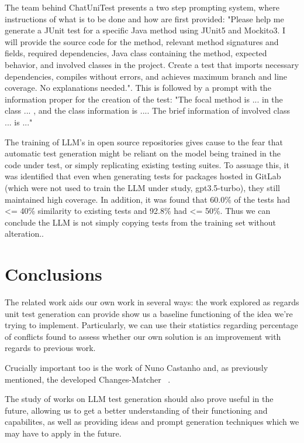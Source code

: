 The team behind ChatUniTest presents a two step prompting system, where instructions of what is to be done and how are first provided: "Please help me generate a JUnit test for a specific Java method using JUnit5 and Mockito3. I will provide the source code for the method, relevant method signatures and fields, required dependencies, Java class containing the method, expected behavior, and involved classes in the project. Create a test that imports necessary dependencies, compiles without errors, and achieves maximum branch and line coverage. No explanations needed.". This is followed by a prompt with the information proper for the creation of the test: "The focal method is ... in the class ... , and the class information is .... The brief information of involved class ... is ..." \citep{kn:chatunitest}


The training of LLM's in open source repositories gives cause to the fear that automatic test generation might be reliant on the model being trained in the code under test, or simply replicating existing testing suites. To assuage this, it was identified that even when generating tests for packages hosted in GitLab (which were not used to train the LLM under study, gpt3.5-turbo), they still maintained high coverage. In addition, it was found that 60.0\% of the tests had <= 40\% similarity to existing tests and 92.8\% had <= 50\%. Thus we can conclude the LLM is not simply copying tests from the training set without alteration.\citep{kn:max}.


\section{Conclusions}


The related work aids our own work in several ways: the work explored as regards unit test generation can provide show us a baseline functioning of the idea we're trying to implement. Particularly, we can use their statistics regarding percentage of conflicts found to assess whether our own solution is an improvement with regards to previous work.

Crucially important too is the work of Nuno Castanho and, as previously mentioned, the developed Changes-Matcher ~\citep{kn:nuno}.

The study of works on LLM test generation should also prove useful in the future, allowing us to get a better understanding of their functioning and capabilites, as well as providing ideas and prompt generation techniques which we may have to apply in the future.